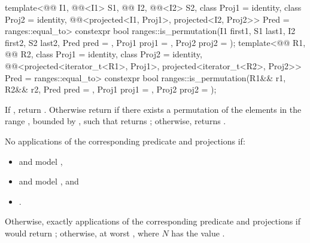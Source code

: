 %
\begin{itemdecl}
template<@@ I1, @@<I1> S1, @@ I2,
         @@<I2> S2, class Proj1 = identity, class Proj2 = identity,
         @@<projected<I1, Proj1>,
                                       projected<I2, Proj2>> Pred = ranges::equal_to>
  constexpr bool ranges::is_permutation(I1 first1, S1 last1, I2 first2, S2 last2,
                                        Pred pred = {},
                                        Proj1 proj1 = {}, Proj2 proj2 = {});
template<@@ R1, @@ R2,
         class Proj1 = identity, class Proj2 = identity,
         @@<projected<iterator_t<R1>, Proj1>,
                                       projected<iterator_t<R2>, Proj2>> Pred = ranges::equal_to>
  constexpr bool ranges::is_permutation(R1&& r1, R2&& r2, Pred pred = {},
                                        Proj1 proj1 = {}, Proj2 proj2 = {});
\end{itemdecl}

\begin{itemdescr}
\pnum
\returns
If , return .
Otherwise return  if there exists a permutation of the elements
in the range , bounded by ,
such that
returns ;
otherwise, returns .

\pnum
\complexity
No applications of the corresponding predicate and projections if:
\begin{itemize}
\item {} and  model ,
\item {} and  model , and
\item {}.
\end{itemize}
Otherwise, exactly  applications
of the corresponding predicate and projections
if 
would return ;
otherwise, at worst , where $N$ has the value .
\end{itemdescr}

